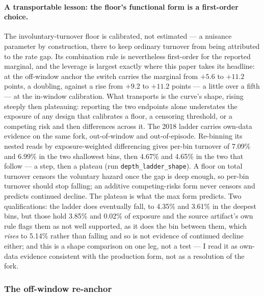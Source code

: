 \paragraph{A transportable lesson: the floor's functional form is a first-order choice.} The involuntary-turnover floor is calibrated, not estimated --- a nuisance parameter by construction, there to keep ordinary turnover from being attributed to the rate gap. Its combination rule is nevertheless first-order for the reported marginal, and the leverage is largest exactly where this paper takes its headline: at the off-window anchor the switch carries the marginal from $+5.6$ to $+11.2$ points, a doubling, against a rise from $+9.2$ to $+11.2$ points --- a little over a fifth --- at the in-window calibration. What transports is the curve's shape, rising steeply then plateauing: reporting the two endpoints alone understates the exposure of any design that calibrates a floor, a censoring threshold, or a competing risk and then differences across it. The 2018 ladder carries own-data evidence on the same fork, out-of-window and out-of-episode. Re-binning its nested reads by exposure-weighted differencing gives per-bin turnover of 7.09\% and 6.99\% in the two shallowest bins, then 4.67\% and 4.65\% in the two that follow --- a step, then a plateau (run \texttt{depth\_ladder\_shape}). A floor on total turnover censors the voluntary hazard once the gap is deep enough, so per-bin turnover should stop falling; an additive competing-risks form never censors and predicts continued decline. The plateau is what the max form predicts. Two qualifications: the ladder does eventually fall, to 4.35\% and 3.61\% in the deepest bins, but those hold 3.85\% and 0.02\% of exposure and the source artifact's own rule flags them as not well supported, as it does the bin between them, which \emph{rises} to 5.14\% rather than falling and so is not evidence of continued decline either; and this is a shape comparison on one leg, not a test --- I read it as own-data evidence consistent with the production form, not as a resolution of the fork.

\subsubsection{The off-window re-anchor}


